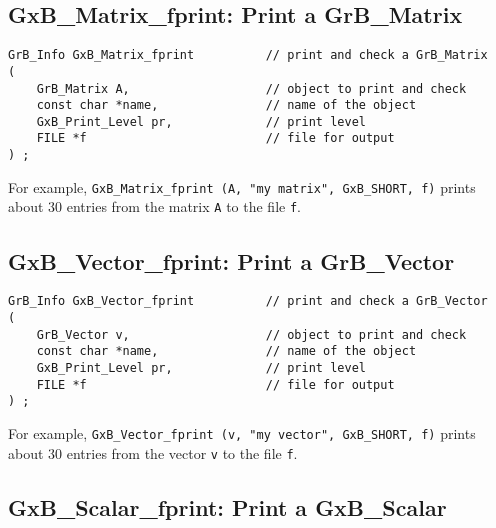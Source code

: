\documentclass[12pt]{article}
\begin{document}
\newpage
\subsection{{\sf GxB\_Matrix\_fprint:} Print a {\sf GrB\_Matrix}}

\begin{mdframed}[userdefinedwidth=6in]
{\footnotesize
\begin{verbatim}
GrB_Info GxB_Matrix_fprint          // print and check a GrB_Matrix
(
    GrB_Matrix A,                   // object to print and check
    const char *name,               // name of the object
    GxB_Print_Level pr,             // print level
    FILE *f                         // file for output
) ;
\end{verbatim} } \end{mdframed}

For example,
\verb'GxB_Matrix_fprint (A, "my matrix", GxB_SHORT, f)'
prints about 30 entries from the matrix \verb'A' to the file \verb'f'.


\subsection{{\sf GxB\_Vector\_fprint:} Print a {\sf GrB\_Vector}}

\begin{mdframed}[userdefinedwidth=6in]
{\footnotesize
\begin{verbatim}
GrB_Info GxB_Vector_fprint          // print and check a GrB_Vector
(
    GrB_Vector v,                   // object to print and check
    const char *name,               // name of the object
    GxB_Print_Level pr,             // print level
    FILE *f                         // file for output
) ;
\end{verbatim} } \end{mdframed}

For example,
\verb'GxB_Vector_fprint (v, "my vector", GxB_SHORT, f)'
prints about 30 entries from the vector \verb'v' to the file \verb'f'.

\subsection{{\sf GxB\_Scalar\_fprint:} Print a {\sf GxB\_Scalar}}
\end{document}
